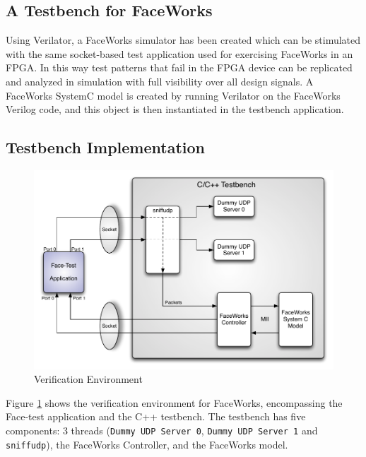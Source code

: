 \documentclass[conference]{IEEEtran}
\begin{document}
\subsection{A Testbench for FaceWorks}


Using Verilator, a FaceWorks simulator has been created which can be stimulated with the same socket-based test application used for exercising FaceWorks in an FPGA. In this way test patterns that fail in the FPGA device can be replicated and analyzed in simulation with full visibility over all design signals. A FaceWorks SystemC model is created by running Verilator on the FaceWorks Verilog code, and this object is then instantiated in the testbench application.

\subsection{Testbench Implementation}


\begin{figure}[h]
  \centering
      \includegraphics[scale=0.5,center]{Diagrams/TestBench-Diag.pdf}
  \caption{Verification Environment }\label{fig:tbschem}
\end{figure}



Figure \ref{fig:tbschem} shows the verification environment for FaceWorks, encompassing the Face-test application and the C++ testbench. The testbench has five components: 3 threads (\texttt{Dummy UDP Server 0}, \texttt{Dummy UDP Server 1} and {\tt sniffudp}), the FaceWorks Controller, and the FaceWorks model.
\end{document}
